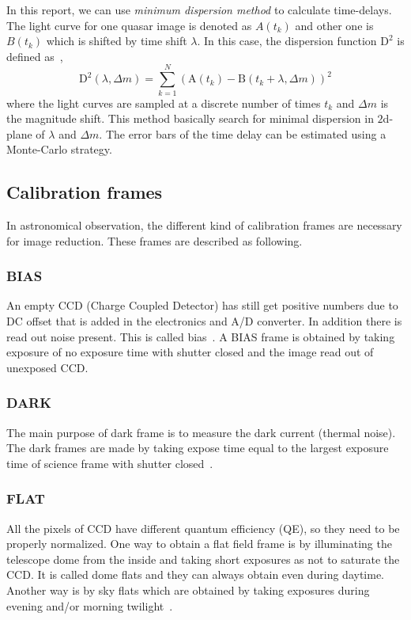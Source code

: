 In this report, we can use \textit{minimum dispersion method} to calculate time-delays. The light curve for one quasar image is denoted as $ A(t_{k}) $ and other one is $ B(t_{k}) $ which is shifted by time shift $ \lambda $. In this case, the dispersion function $ \text{D}^2 $ is defined as~\cite{manual},
\begin{equation}
\text{D}^2(\lambda, \Delta m)=\sum_{k=1}^{N}(\text{A}(t_{k}) - \text{B}(t_{k}+\lambda, \Delta m) )^2
\label{math:disp}
\end{equation}
where the light curves are sampled at a discrete number of times $ t_{k}$ and $\Delta m$ is the magnitude shift. This method basically search for minimal dispersion in $2$d-plane of $\lambda$ and $\Delta m$.
The error bars of the time delay can be estimated using a Monte-Carlo strategy.

\subsection{Calibration frames}
In astronomical observation, the different kind of calibration frames are necessary for image reduction. These frames are described as following.

\subsubsection{BIAS}
An empty CCD (Charge Coupled Detector) has still get positive numbers due to DC offset that is added in the electronics and A/D converter. In addition there is read out noise present. This is called bias~\cite{manual}. 
A BIAS frame is obtained by taking exposure of no exposure time with shutter closed and the image read out of unexposed CCD. 

\subsubsection{DARK}
The main purpose of dark frame is to measure the dark current (thermal noise). The dark frames are made by taking expose time equal to the largest exposure time of science frame with shutter closed~\cite{manual}. 

\subsubsection{FLAT}
All the pixels of CCD have different quantum efficiency (QE), so they need to be properly normalized. One way to obtain a flat field frame is by illuminating the telescope dome from the inside and taking short exposures as not to saturate the CCD. It is called dome flats and they can always obtain even during daytime. Another way is by sky flats which are obtained by taking exposures during evening and/or morning twilight~\cite{manual}. 

